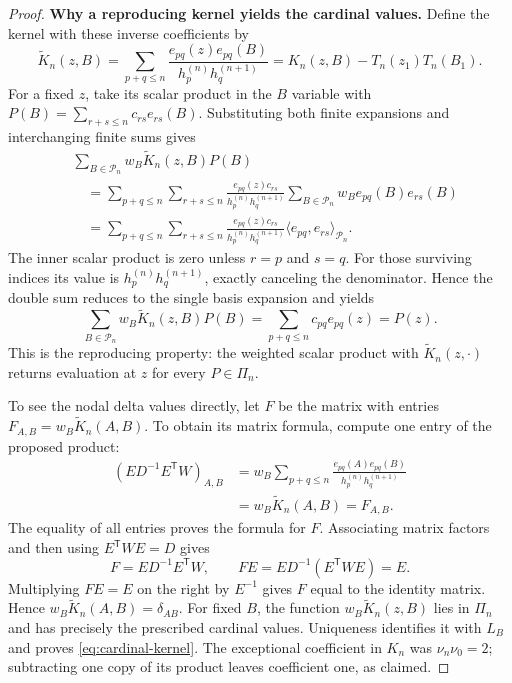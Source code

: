 \begin{proof}
\noindent\textbf{Why a reproducing kernel yields the cardinal values.}
Define the kernel with these inverse coefficients by
\[
 \widetilde K_n(z,B)=\sum_{p+q\leq n}
   \frac{e_{pq}(z)e_{pq}(B)}{h_p^{(n)}h_q^{(n+1)}}
        =K_n(z,B)-T_n(z_1)T_n(B_1).
\]
For a fixed $z$, take its scalar product in the $B$ variable with
$P(B)=\sum_{r+s\leq n}c_{rs}e_{rs}(B)$. Substituting both finite
expansions and interchanging finite sums gives
\begin{align*}
 &\sum_{B\in\mathcal P_n}w_B \widetilde K_n(z,B)P(B)\\
 &\quad=\sum_{p+q\leq n}\sum_{r+s\leq n}
    \frac{e_{pq}(z)c_{rs}}{h_p^{(n)}h_q^{(n+1)}}
       \sum_{B\in\mathcal P_n}w_Be_{pq}(B)e_{rs}(B)\\
 &\quad=\sum_{p+q\leq n}\sum_{r+s\leq n}
    \frac{e_{pq}(z)c_{rs}}{h_p^{(n)}h_q^{(n+1)}}
          \langle e_{pq},e_{rs}\rangle_{\mathcal P_n}.
\end{align*}
The inner scalar product is zero unless $r=p$ and $s=q$. For those
surviving indices its value is $h_p^{(n)}h_q^{(n+1)}$, exactly
canceling the denominator. Hence the double sum reduces to the single
basis expansion and yields
\[
 \sum_{B\in\mathcal P_n}w_B \widetilde K_n(z,B)P(B)
      =\sum_{p+q\leq n}c_{pq}e_{pq}(z)=P(z).
\]
This is the reproducing property: the weighted scalar product with
$\widetilde K_n(z,\cdot)$ returns evaluation at $z$ for every $P\in\Pi_n$.

To see the nodal delta values directly, let $F$ be the matrix with
entries $F_{A,B}=w_B \widetilde K_n(A,B)$. To obtain its matrix formula, compute
one entry of the proposed product:
\begin{align*}
 (ED^{-1}E^{\mathsf T}W)_{A,B}
 &=w_B\sum_{p+q\leq n}
       \frac{e_{pq}(A)e_{pq}(B)}{h_p^{(n)}h_q^{(n+1)}}\\
 &=w_B\widetilde K_n(A,B)=F_{A,B}.
\end{align*}
The equality of all entries proves the formula for $F$. Associating
matrix factors and then using $E^{\mathsf T}WE=D$ gives
\[
 F=ED^{-1}E^{\mathsf T}W,
 \qquad FE=ED^{-1}(E^{\mathsf T}WE)=E.
\]
Multiplying $FE=E$ on the right by $E^{-1}$ gives $F$ equal to the
identity matrix. Hence $w_B \widetilde K_n(A,B)=\delta_{AB}$. For fixed $B$,
the function $w_B \widetilde K_n(z,B)$ lies in $\Pi_n$ and has precisely the
prescribed cardinal values. Uniqueness identifies it with $L_B$ and
proves \eqref{eq:cardinal-kernel}. The exceptional coefficient in $K_n$
was $\nu_n\nu_0=2$; subtracting one copy of its product leaves
coefficient one, as claimed.
\end{proof}

